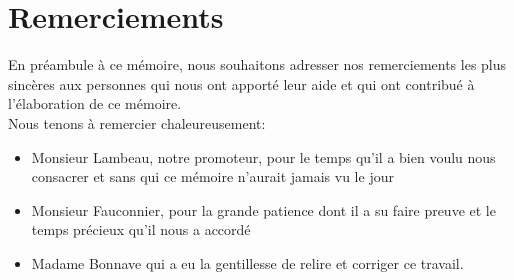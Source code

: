 
\newpage
\chapter*{Remerciements}
En préambule à ce mémoire, nous souhaitons adresser nos remerciements les plus sincères aux personnes qui nous ont apporté
leur aide et qui ont contribué à l'élaboration de ce mémoire.\\
\newline
\indent
Nous tenons à remercier chaleureusement:
\begin{itemize}
\item Monsieur Lambeau, notre promoteur, pour le temps qu'il a bien voulu nous consacrer et sans qui ce mémoire n'aurait jamais vu le jour\\

\item Monsieur Fauconnier, pour la grande patience dont il a su faire preuve et le temps précieux qu'il nous a accordé\\
\item Madame Bonnave qui a eu la gentillesse de relire et corriger ce travail.\\
\end{itemize}
